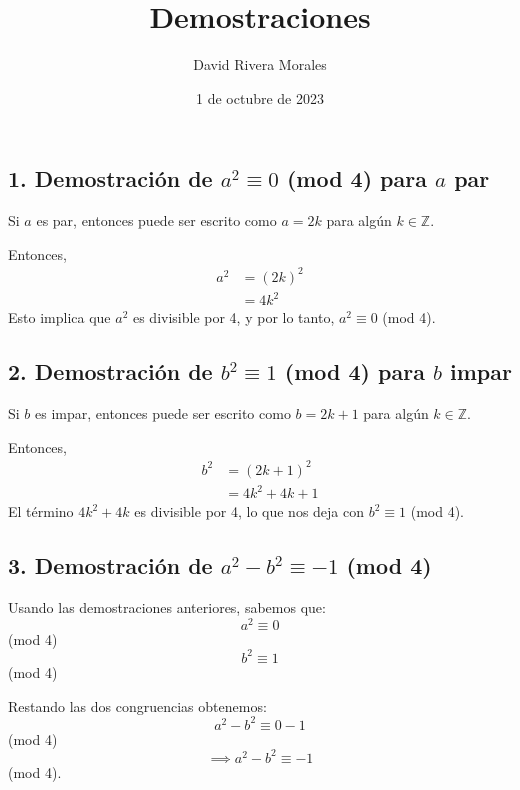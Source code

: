 \documentclass{article}
\author{David Rivera Morales}
\title{Demostraciones}
\date{1 de octubre de 2023}
\begin{document}
\maketitle


\subsection*{1. Demostración de \(a^2 \equiv 0 \) (mod 4) para \( a \) par}
Si \( a \) es par, entonces puede ser escrito como \( a = 2k \) para algún \( k \in \mathbb{Z} \).

Entonces,
\begin{align*}
a^2 &= (2k)^2 \\
&= 4k^2
\end{align*}
Esto implica que \( a^2 \) es divisible por 4, y por lo tanto, \( a^2 \equiv 0 \) (mod 4).

\subsection*{2. Demostración de \(b^2 \equiv 1 \) (mod 4) para \( b \) impar}
Si \( b \) es impar, entonces puede ser escrito como \( b = 2k + 1 \) para algún \( k \in \mathbb{Z} \).

Entonces,
\begin{align*}
b^2 &= (2k + 1)^2 \\
&= 4k^2 + 4k + 1
\end{align*}
El término \( 4k^2 + 4k \) es  divisible por 4, lo que nos deja con \( b^2 \equiv 1 \) (mod 4).

\subsection*{3. Demostración de \(a^2 - b^2 \equiv -1 \) (mod 4)}
Usando las demostraciones anteriores, sabemos que:
\[ a^2 \equiv 0 \] (mod 4) \\
\[ b^2 \equiv 1 \] (mod 4)

Restando las dos congruencias obtenemos:
\[ a^2 - b^2 \equiv 0 - 1 \] (mod 4)
\[ \implies a^2 - b^2 \equiv -1 \] (mod 4).
\end{document}
